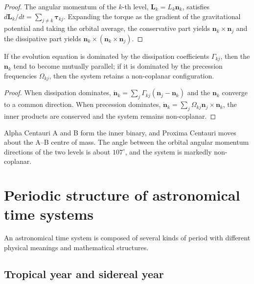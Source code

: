 \begin{proof}
The angular momentum of the \(k\)-th level, \(\mathbf L_k=L_k\mathbf n_k\), satisfies \(d\mathbf L_k/dt=\sum_{j\neq k}\boldsymbol\tau_{kj}\). Expanding the torque as the gradient of the gravitational potential and taking the orbital average, the conservative part yields \(\mathbf n_k\times\mathbf n_j\) and the dissipative part yields \(\mathbf n_k\times(\mathbf n_k\times\mathbf n_j)\).
\end{proof}

\begin{corollary}\label{cor:dynamic_axis_alignment}
If the evolution equation is dominated by the dissipation coefficients \(\Gamma_{kj}\), then the \(\mathbf n_k\) tend to become mutually parallel; if it is dominated by the precession frequencies \(\Omega_{kj}\), then the system retains a non-coplanar configuration.
\end{corollary}

\begin{proof}
When dissipation dominates, \(\dot{\mathbf n}_k=\sum_j\Gamma_{kj}(\mathbf n_j-\mathbf n_k)\) and the \(\mathbf n_k\) converge to a common direction. When precession dominates, \(\dot{\mathbf n}_k=\sum_j\Omega_{kj}\mathbf n_j\times\mathbf n_k\), the inner products are conserved and the system remains non-coplanar.
\end{proof}

\begin{example}
Alpha Centauri A and B form the inner binary, and Proxima Centauri moves about the A--B centre of mass. The angle between the orbital angular momentum directions of the two levels is about \(107^\circ\), and the system is markedly non-coplanar.
\end{example}

\section{Periodic structure of astronomical time systems}
\label{sec:astro_time_systems}

An astronomical time system is composed of several kinds of period with different physical meanings and mathematical structures.

\subsection{Tropical year and sidereal year}

